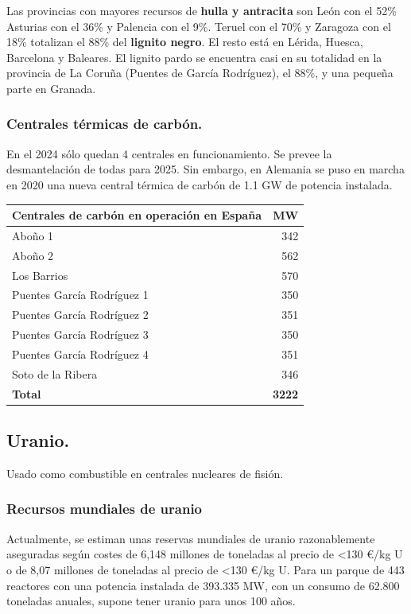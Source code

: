 			
			Las provincias con mayores recursos de \textbf{hulla y antracita} son León con el 52\% Asturias con el 36\% y Palencia con el 9\%. Teruel con el 70\% y Zaragoza con el 18\% totalizan el 88\% del \textbf{lignito negro}. El resto está en Lérida, Huesca, Barcelona y Baleares. El lignito pardo se encuentra casi en su totalidad en la provincia de La Coruña (Puentes de García Rodríguez), el 88\%, y una pequeña parte en Granada.
			
		\subsubsection{Centrales térmicas de carbón.}
			En el 2024 sólo quedan 4 centrales en funcionamiento. Se prevee la desmantelación de todas para 2025. Sin embargo, en Alemania se puso en marcha en 2020 una nueva central térmica de carbón de 1.1 GW de potencia instalada.
			
			\begin{table}[H]
				\renewcommand{\arraystretch}{1.2}
				\centering
				\begin{tabular}{lr}
					\hline
					\textbf{Centrales de carbón en operación en España} & \textbf{MW}\\
					\hline
					Aboño 1 & 342\\
					Aboño 2 & 562\\
					Los Barrios & 570\\
					Puentes García Rodríguez 1 & 350\\
					Puentes García Rodríguez 2 & 351\\
					Puentes García Rodríguez 3 & 350\\
					Puentes García Rodríguez 4 & 351\\
					Soto de la Ribera & 346\\
					\hline
					\textbf{Total} & \textbf{3222}\\
					\hline
				\end{tabular}
			\end{table}
			
	\subsection{Uranio.}
		Usado como combustible en centrales nucleares de fisión.
		
		\subsubsection{Recursos mundiales de uranio}
			Actualmente, se estiman unas reservas mundiales de uranio razonablemente aseguradas según costes de 6,148 millones de toneladas al precio de <130 €/kg U o de 8,07 millones de toneladas al precio de <130 €/kg U. Para un parque de 443 reactores con una potencia instalada de 393.335 MW, con un consumo de
			62.800 toneladas anuales, supone tener uranio para unos 100 años.
			
